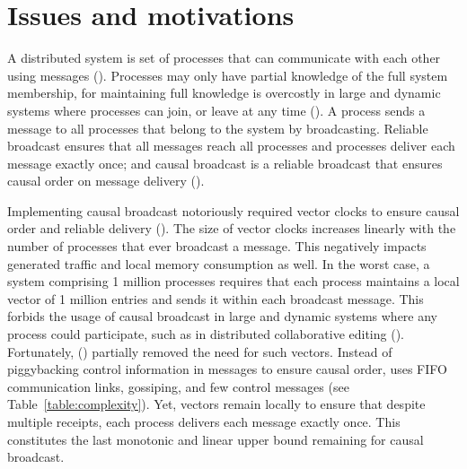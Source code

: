
\section{Issues and motivations}
\label{sec:motivations}

A distributed system is set of processes that can communicate with each other
using messages (\REF). Processes may only have partial knowledge of the full
system membership, for maintaining full knowledge is overcostly in large and
dynamic systems where processes can join, or leave at any time (\REF). A process
sends a message to all processes that belong to the system by
broadcasting. Reliable broadcast ensures that all messages reach all processes
and processes deliver each message exactly once; and causal broadcast is a
reliable broadcast that ensures causal order on message delivery (\REF).


Implementing causal broadcast notoriously required vector clocks to ensure
causal order and reliable delivery (\REF). The size of vector clocks increases
linearly with the number of processes that ever broadcast a message.  This
negatively impacts generated traffic and local memory consumption as well.  In
the worst case, a system comprising 1 million processes requires that each
process maintains a local vector of 1 million entries and sends it within each
broadcast message. This forbids the usage of causal broadcast in large and
dynamic systems where any process could participate, such as in distributed
collaborative editing (\REF). Fortunately, \PCBROADCAST (\REF) partially removed
the need for such vectors. Instead of piggybacking control information in
messages to ensure causal order, \PCBROADCAST uses FIFO communication links,
gossiping, and few control messages (see Table~\ref{table:complexity}). Yet,
vectors remain locally to ensure that despite multiple receipts, each process
delivers each message exactly once. This constitutes the last monotonic and
linear upper bound remaining for causal broadcast.


